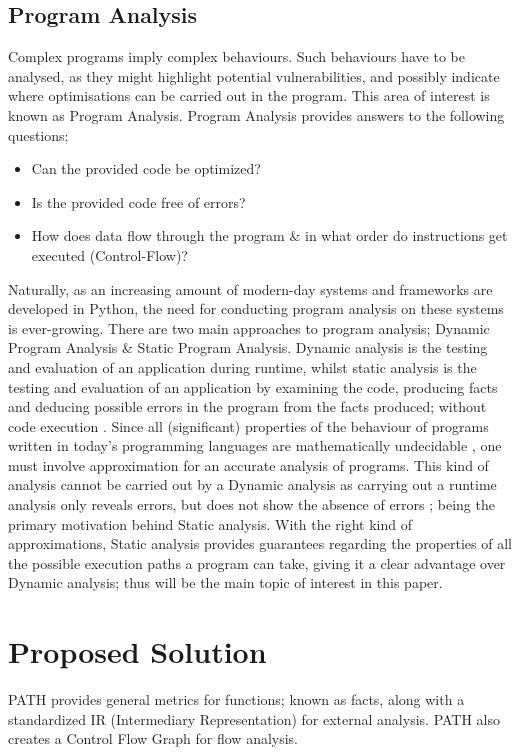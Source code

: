     \subsection{Program Analysis}
    \par Complex programs imply complex behaviours. Such behaviours have to be analysed, as they might
    highlight potential vulnerabilities, and possibly indicate where optimisations can be carried out in the program.
    This area of interest is known as Program Analysis. Program Analysis provides answers to the following questions;
    \begin{itemize}
        \item Can the provided code be optimized?
        \item Is the provided code free of errors?
        \item How does data flow through the program \& in what order do instructions get executed (Control-Flow)?
    \end{itemize}
    \par Naturally, as an increasing amount of modern-day systems and frameworks are developed in Python, the need for conducting program analysis on these systems is ever-growing.
    There are two main approaches to program analysis; Dynamic Program Analysis \& Static Program Analysis. Dynamic analysis is the testing and evaluation of 
    an application during runtime, whilst static analysis is the testing and evaluation of an application by examining the code, producing facts and deducing
    possible errors in the program from the facts produced; without code execution \cite{intel2013analysis}. Since all (significant) properties of the 
    behaviour of programs written in today's programming languages are mathematically undecidable \cite{rice1953classes}, one must involve approximation
    for an accurate analysis of programs. This kind of analysis cannot be carried out by a Dynamic analysis as carrying out a runtime
    analysis only reveals errors, but does not show the absence of errors \cite{moller2012static}; being the primary motivation behind Static analysis. With the 
    right kind of approximations, Static analysis provides guarantees regarding the properties of all the possible execution paths
    a program can take, giving it a clear advantage over Dynamic analysis; thus will be the main topic of interest in this paper. 

    \section{Proposed Solution}
    \label{sec:propsol}
    \par \acs{PATH} provides general metrics for functions; known as facts, along with a
    standardized IR (Intermediary Representation) for external analysis. \acs{PATH} also creates a Control Flow Graph for flow analysis.

